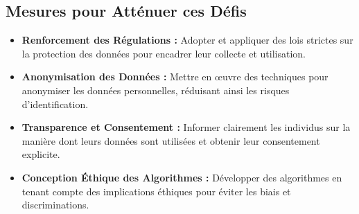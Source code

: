 \documentclass[a4paper,12pt]{report}
\begin{document}
		\subsection{Mesures pour Atténuer ces Défis}
			\begin{itemize}
				\item \textbf{Renforcement des Régulations :} Adopter et appliquer des lois strictes sur la protection des données pour encadrer leur collecte et utilisation.
				\item \textbf{Anonymisation des Données :} Mettre en œuvre des techniques pour anonymiser les données personnelles, réduisant ainsi les risques d'identification.
				\item \textbf{Transparence et Consentement :} Informer clairement les individus sur la manière dont leurs données sont utilisées et obtenir leur consentement explicite.
				\item \textbf{Conception Éthique des Algorithmes :} Développer des algorithmes en tenant compte des implications éthiques pour éviter les biais et discriminations.
			\end{itemize}



\end{document}

